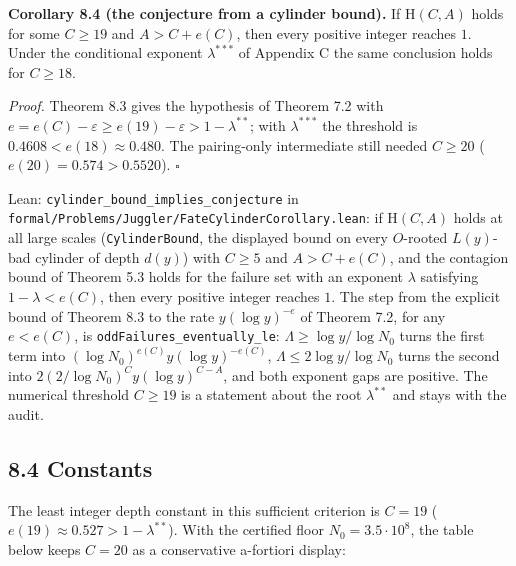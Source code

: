 \documentclass[11pt,a4paper]{article}
\begin{document}
\textbf{Corollary 8.4 (the conjecture from a cylinder bound).} If
\(\mathrm H(C,A)\) holds for some \(C\ge 19\) and \(A>C+e(C)\), then
every positive integer reaches \(1\). Under the conditional exponent
\(\lambda^{***}\) of Appendix C the same conclusion holds for
\(C\ge 18\).

\emph{Proof.} Theorem 8.3 gives the hypothesis of Theorem 7.2 with
\(e=e(C)-\varepsilon\ge e(19)-\varepsilon>1-\lambda^{**}\); with
\(\lambda^{***}\) the threshold is \(0.4608<e(18)\approx0.480\). The
pairing-only intermediate still needed \(C\ge 20\)
(\(e(20)=0.574>0.5520\)). \(\square\)

Lean: \texttt{\nolinkurl{cylinder_bound_implies_conjecture}} in
\texttt{\nolinkurl{formal/Problems/Juggler/FateCylinderCorollary.lean}}:
if \(\mathrm H(C,A)\) holds at all large scales
(\texttt{\nolinkurl{CylinderBound}}, the displayed bound on every
\(O\)-rooted \(L(y)\)-bad cylinder of depth \(d(y)\)) with \(C\ge 5\)
and \(A>C+e(C)\), and the contagion bound of Theorem 5.3 holds for the
failure set with an exponent \(\lambda\) satisfying \(1-\lambda<e(C)\),
then every positive integer reaches \(1\). The step from the explicit
bound of Theorem 8.3 to the rate \(y(\log y)^{-e}\) of Theorem 7.2, for
any \(e<e(C)\), is \texttt{\nolinkurl{oddFailures_eventually_le}}:
\(\Lambda\ge\log y/\log N_0\) turns the first term into
\((\log N_0)^{e(C)}y(\log y)^{-e(C)}\), \(\Lambda\le 2\log y/\log N_0\)
turns the second into \(2(2/\log N_0)^Cy(\log y)^{C-A}\), and both
exponent gaps are positive. The numerical threshold \(C\ge 19\) is a
statement about the root \(\lambda^{**}\) and stays with the audit.

\subsection{8.4 Constants}\label{constants}

The least integer depth constant in this sufficient criterion is
\(C=19\) (\(e(19)\approx0.527>1-\lambda^{**}\)). With the certified
floor \(N_0=3.5\cdot 10^8\), the table below keeps \(C=20\) as a
conservative a-fortiori display:

\begingroup\small
\end{document}
